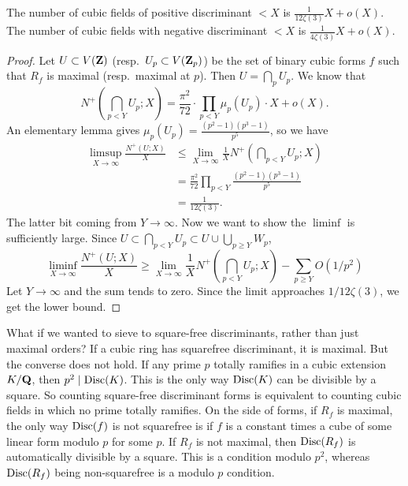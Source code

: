 \begin{theo}
The number of cubic fields of positive discriminant $<X$ is 
$\frac{1}{12\zeta(3)} X + o(X)$. The number of cubic fields with negative 
discriminant $<X$ is $\frac{1}{4\zeta(3)} X + o(X)$. 
\end{theo}
\begin{proof}
Let $U\subset V(\mathbf{Z})$ (resp.~$U_p\subset V(\mathbf{Z}_p)$) be the set of binary cubic 
forms $f$ such that $R_f$ is maximal (resp.~maximal at $p$). Then 
$U=\bigcap_p U_p$. We know that 
\[
  N^+\left(\bigcap_{p<Y} U_p;X\right) = \frac{\pi^2}{72} \cdot \prod_{p<Y} \mu_p(U_p) \cdot X + o(X) .
\]
An elementary lemma gives $\mu_p(U_p) = \frac{(p^2-1)(p^3-1)}{p^5}$, so we 
have 
\begin{align*}
  \limsup_{X\to \infty} \frac{N^+(U;X)}{X} 
    &\leqslant \lim_{X\to \infty} \frac 1 X N^+\left(\bigcap_{p<Y} U_p; X\right)\\
    &= \frac{\pi^2}{72} \prod_{p<Y} \frac{(p^2-1)(p^3-1)}{p^5} \\
    &= \frac{1}{12\zeta(3)} .
\end{align*}
The latter bit coming from $Y\to \infty$. Now we want to show the $\liminf$ is 
sufficiently large. Since 
$U \subset \bigcap_{p<Y} U_p\subset U\cup \bigcup_{p\geqslant Y} W_p$, 
\[
  \liminf_{X\to \infty} \frac{N^+(U;X)}{X} \geqslant \lim_{X\to \infty} \frac 1 X N^+\left(\bigcap_{p<Y} U_p;X\right) - \sum_{p\geqslant Y} O(1/p^2) 
\]
Let $Y\to \infty$ and the sum tends to zero. Since the limit approaches 
$1/12\zeta(3)$, we get the lower bound. 
\end{proof}

What if we wanted to sieve to square-free discriminants, rather than just 
maximal orders? If a cubic ring has squarefree discriminant, it is maximal. But 
the converse does not hold. If any prime $p$ totally ramifies in a cubic 
extension $K/\mathbf{Q}$, then $p^2\mid\operatorname{Disc}(K)$. This is the only way 
$\operatorname{Disc}(K)$ can be divisible by a square. So counting square-free 
discriminant forms is equivalent to counting cubic fields in which no prime 
totally ramifies. On the side of forms, if $R_f$ is maximal, the only way 
$\operatorname{Disc}(f)$ is not squarefree is if $f$ is a constant times a cube 
of some linear form modulo $p$ for some $p$. If $R_f$ is not maximal, then 
$\operatorname{Disc}(R_f)$ is automatically divisible by a square. This is a 
condition modulo $p^2$, whereas $\operatorname{Disc}(R_f)$ being non-squarefree is 
a modulo $p$ condition. 





